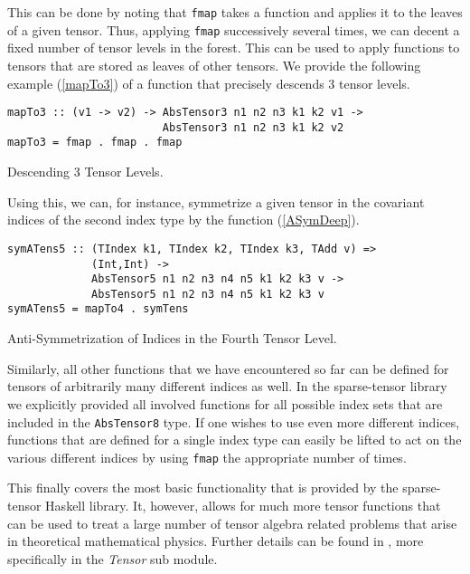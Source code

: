 This can be done by noting that \texttt{fmap} takes a function and applies it to the leaves of a given tensor. Thus, applying \texttt{fmap} successively several times, we can decent a fixed number of tensor levels in the forest. This can be used to apply functions to tensors that are stored as leaves of other tensors. We provide the following example (\ref{mapTo3}) of a function that precisely descends $3$ tensor levels.
\begin{listing}[hbt!]
\begin{verbatim}
mapTo3 :: (v1 -> v2) -> AbsTensor3 n1 n2 n3 k1 k2 v1 -> 
                        AbsTensor3 n1 n2 n3 k1 k2 v2
mapTo3 = fmap . fmap . fmap
\end{verbatim}
\caption{Descending 3 Tensor Levels.}\label{mapTo3}
\end{listing}
Using this, we can, for instance, symmetrize a given tensor in the covariant indices of the second index type by the function (\ref{ASymDeep}).
\begin{listing}[hbt!]
\begin{verbatim}
symATens5 :: (TIndex k1, TIndex k2, TIndex k3, TAdd v) =>
             (Int,Int) ->
             AbsTensor5 n1 n2 n3 n4 n5 k1 k2 k3 v ->
             AbsTensor5 n1 n2 n3 n4 n5 k1 k2 k3 v
symATens5 = mapTo4 . symTens
\end{verbatim} 
\caption{Anti-Symmetrization of Indices in the Fourth Tensor Level. }\label{ASymDeep}
\end{listing}
Similarly, all other functions that we have encountered so far can be defined for tensors of arbitrarily many different indices as well. In the sparse-tensor library we explicitly provided all involved functions for all possible index sets that are included in the \texttt{AbsTensor8} type. If one wishes to use even more different indices, functions that are defined for a single index type can easily be lifted to act on the various different indices by using \texttt{fmap} the appropriate number of times. 

This finally covers the most basic functionality that is provided by the sparse-tensor Haskell library. It, however, allows for much more tensor functions that can be used to treat a large number of tensor algebra related problems that arise in theoretical mathematical physics. 
Further details can be found in \cite{sparse-tensor}, more specifically in the \textit{Tensor} sub module.

